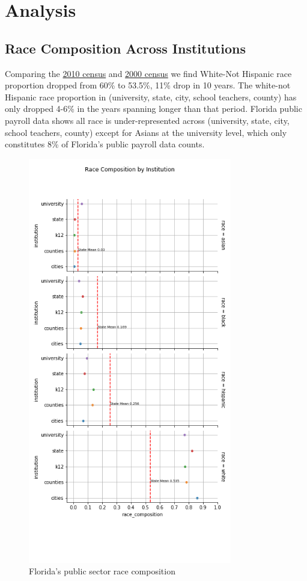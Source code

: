 \section{Analysis}

\label{intro}

\subsection{Race Composition Across Institutions}
Comparing the  \href{https://en.wikipedia.org/wiki/Demographics_of_Florida}{2010 census}  and \href{https://www.census.gov/prod/2002pubs/c2kprof00-fl.pdf}{2000 census} we find 
White-Not Hispanic race proportion dropped from 60\% to 53.5\%, 11\% drop in 10 years.  The white-not Hispanic race proportion in (university, state, city, school teachers, county) has only dropped 4-6\% in the years spanning longer than that period.  Florida public payroll data shows all race is under-represented across (university, state, city, school teachers, county) except for Asians at the university level, which only constitutes 8\% of Florida's public payroll data counts.


\begin{figure}[H]
\begin{center}
\includegraphics[width=3.5in]{Figures/race_composition_across_inst.png}
\caption{Florida's public sector race composition}
\label{styleResponse}
\end{center}
\end{figure}


